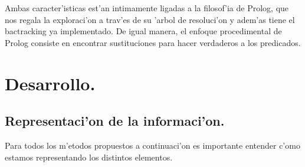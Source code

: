 \documentclass[12pt]{article}
\begin{document}
    Ambas caracter'isticas est'an intimamente ligadas a la filosof'ia de Prolog, que nos regala la exploraci'on a trav'es
    de su 'arbol de resoluci'on y adem'as tiene el bactracking ya implementado. De igual manera, el enfoque
    procedimental de Prolog consiste en encontrar sustituciones para hacer verdaderos a los predicados.




    \section{Desarrollo.}\label{section: desarrollo}

    \subsection{Representaci'on de la informaci'on.}
    Para todos los m'etodos propuestos a continuaci'on es importante
    entender c'omo estamos representando los distintos
    elementos.
\end{document}
